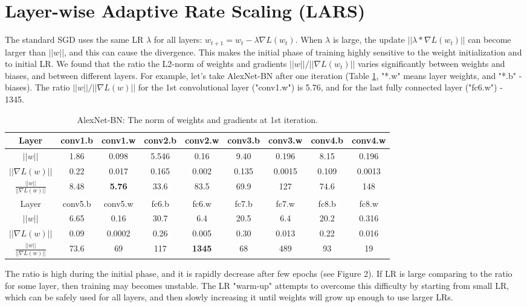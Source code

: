 \documentclass{article} %
\begin{document}
\section{Layer-wise Adaptive Rate Scaling (LARS)}

The  standard SGD uses the same LR $\lambda$ for all layers:  $w_{t+1} = w_t - \lambda \nabla L(w_t)$. When $\lambda$ is large, the update  $||\lambda * \nabla L(w_t)||$ can become larger than  $||w||$, and this can cause the divergence. This makes the initial phase of training highly sensitive to the weight initialization and to initial LR. We found that the ratio the L2-norm of weights and gradients $||w|| /|| \nabla  L(w_t)||$ varies significantly between weights and biases, and between different layers. For example, let's take AlexNet-BN after one iteration (Table \ref{tab:weight_gradient}, "*.w" means layer weights, and "*.b" - biases). The ratio $||w|| / ||\nabla L(w)||$ for the 1st convolutional layer ("conv1.w") is 5.76, and for the last fully connected layer ("fc6.w") - 1345.
 \begin{table}[htb!]
 \caption{AlexNet-BN: The norm of weights and gradients at 1st iteration.
}
 \label{tab:weight_gradient}
 \centering
 \vspace{3pt}
 \begin{tabular}{|c|cc |cc|cc|cc|}
 \hline Layer  & conv1.b & conv1.w & conv2.b & conv2.w & conv3.b & conv3.w & conv4.b & conv4.w \\
  \hline $||w||$
    & 1.86 & 0.098 & 5.546 & 0.16  & 9.40  & 0.196  & 8.15  & 0.196  \\
  \hline $||\nabla L(w)||$
    & 0.22 & 0.017 & 0.165 & 0.002 & 0.135 & 0.0015 & 0.109 & 0.0013 \\
  \hline  $\frac{||w||} { ||\nabla L(w)||}$  
    & 8.48 & {\bf 5.76} & 33.6 & 83.5 & 69.9 & 127 & 74.6 & 148 \\
  \hline
  \hline Layer & conv5.b & conv5.w & fc6.b & fc6.w & fc7.b & fc7.w & fc8.b & fc8.w\\
  \hline $||w||$ 
    & 6.65 & 0.16 & 30.7 & 6.4 & 20.5 & 6.4 & 20.2 & 0.316\\
  \hline  $||\nabla L(w)||$ 
    & 0.09 & 0.0002 & 0.26 & 0.005 & 0.30 & 0.013 & 0.22 & 0.016\\
   \hline  $\frac{||w||} { ||\nabla L(w)||}$ 
    & 73.6 & 69 & 117 & {\bf 1345} & 68 & 489 & 93 & 19\\
  \hline
  \end{tabular}
\end{table}
The ratio is high during the initial phase, and it is rapidly decrease after few epochs (see Figure 2). If LR is large comparing to the ratio for some layer, then training may becomes unstable. The LR "warm-up" attempts to overcome this difficulty by starting from small LR, which can be safely used for all layers, and then slowly increasing it until weights will grow up enough to use larger LRs.
 
\end{document}
